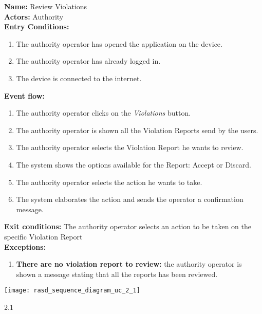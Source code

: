 \begin{usecase}{2.1}
    \textbf{Name:} Review Violations \\
    \textbf{Actors:} Authority \\
    \textbf{Entry Conditions:}
    \begin{enumerate}
        \item The authority operator has opened the application on the device.
        \item The authority operator has already logged in.
        \item The device is connected to the internet.
    \end{enumerate}
    \textbf{Event flow:}
    \begin{enumerate}
        \item The authority operator clicks on the \emph{Violations} button.
        \item The authority operator is shown all the Violation Reports send by
        the users.
        \item The authority operator selects the Violation Report he wants to
        review.
        \item The system shows the options available for the Report: Accept or
        Discard.
        \item The authority operator selects the action he wants to take.
        \item The system elaborates the action and sends the operator a
        confirmation message.
    \end{enumerate}
    \textbf{Exit conditions:} The authority operator selects an action to be
    taken on the specific Violation Report \\
    \textbf{Exceptions:}
    \begin{enumerate}
        \item \textbf{There are no violation report to review:} the authority
        operator is shown a message stating that all the reports has been
        reviewed.
    \end{enumerate}
    \tcblower
    \centering
    \texttt{[image: rasd\_sequence\_diagram\_uc\_2\_1]}
\end{usecase}{2.1}
